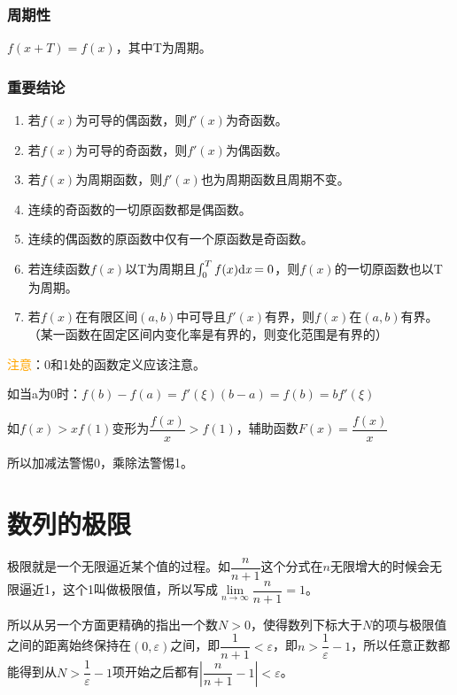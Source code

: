 \documentclass[UTF8, 12pt]{ctexart}
\begin{document}
    \subsubsection{周期性}

    $f(x+T)=f(x)$，其中T为周期。 \medskip

    \subsubsection{重要结论}

    \begin{enumerate}
        \item 若$f(x)$为可导的偶函数，则$f'(x)$为奇函数。
        \item 若$f(x)$为可导的奇函数，则$f'(x)$为偶函数。
        \item 若$f(x)$为周期函数，则$f'(x)$也为周期函数且周期不变。
        \item 连续的奇函数的一切原函数都是偶函数。
        \item 连续的偶函数的原函数中仅有一个原函数是奇函数。
        \item 若连续函数$f(x)$以T为周期且$\int_{0}^{T}f(x)\rm{d}\textit{x}=0$，则$f(x)$的一切原函数也以T为周期。
        \item 若$f(x)$在有限区间$(a,b)$中可导且$f'(x)$有界，则$f(x)$在$(a,b)$有界。（某一函数在固定区间内变化率是有界的，则变化范围是有界的）
    \end{enumerate}

    \textcolor{orange}{注意}：0和1处的函数定义应该注意。

    如当a为0时：$f(b)-f(a)=f'(\xi )(b-a)=f(b)=bf'(\xi)$

    如$f(x)>xf(1)$变形为$\dfrac{f(x)}{x}>f(1)$，辅助函数$F(x)=\dfrac{f(x)}{x}$

    所以加减法警惕0，乘除法警惕1。


    \section{数列的极限}

    极限就是一个无限逼近某个值的过程。如$\dfrac{n}{n+1}$这个分式在$n$无限增大的时候会无限逼近1，这个1叫做极限值，所以写成$\lim\limits_{n\to\infty}\dfrac{n}{n+1}=1$。

    所以从另一个方面更精确的指出一个数$N>0$，使得数列下标大于$N$的项与极限值之间的距离始终保持在$(0,\varepsilon)$之间，即$\dfrac{1}{n+1}<\varepsilon$，即$n>\dfrac{1}{\varepsilon}-1$，所以任意正数都能得到从$N>\dfrac{1}{\varepsilon}-1$项开始之后都有$\left\vert\dfrac{n}{n+1}-1\right\vert<\varepsilon$。
\end{document}
